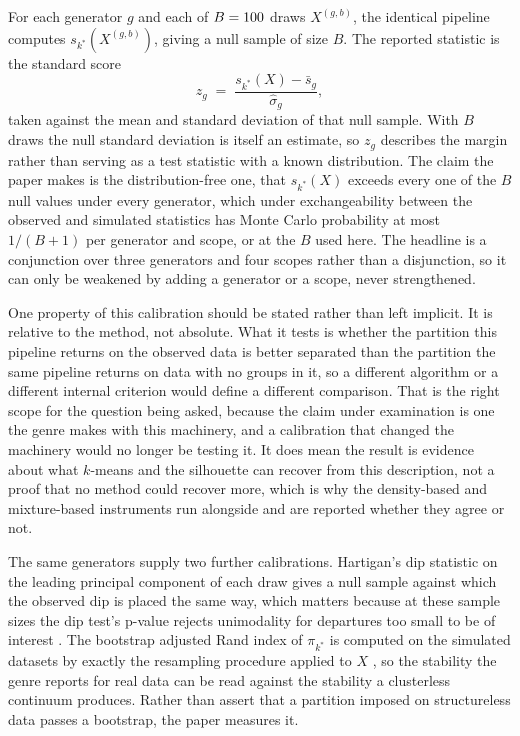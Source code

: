 For each generator $g$ and each of $B = 100{}$ draws $X^{(g,b)}$, the identical
pipeline computes $s_{k^\ast}(X^{(g,b)})$, giving a null sample of size $B$. The reported
statistic is the standard score
\[
  z_g \;=\; \frac{s_{k^\ast}(X) - \bar s_g}{\hat\sigma_g},
\]
taken against the mean and standard deviation of that null sample. With $B$ draws the null
standard deviation is itself an estimate, so $z_g$ describes the margin rather than serving as a
test statistic with a known distribution. The claim the paper makes is the distribution-free
one, that $s_{k^\ast}(X)$ exceeds every one of the $B$ null values under every generator, which
under exchangeability between the observed and simulated statistics has Monte Carlo probability
at most $1/(B+1)$ per generator and scope, or \StrMCBound{} at the $B$ used here. The headline is a conjunction over three generators
and four scopes rather than a disjunction, so it can only be weakened by adding a generator or a
scope, never strengthened.

One property of this calibration should be stated rather than left implicit. It is relative to
the method, not absolute. What it tests is whether the partition this pipeline returns on the
observed data is better separated than the partition the same pipeline returns on data with no
groups in it, so a different algorithm or a different internal criterion would define a
different comparison. That is the right scope for the question being asked, because the claim
under examination is one the genre makes with this machinery, and a calibration that changed
the machinery would no longer be testing it. It does mean the result is evidence about what
$k$-means and the silhouette can recover from this description, not a proof that no method
could recover more, which is why the density-based and mixture-based instruments run alongside
and are reported whether they agree or not.

The same generators supply two further calibrations. Hartigan's dip statistic on the leading
principal component of each draw gives a null sample against which the observed dip is placed
the same way, which matters because at these sample sizes the dip test's p-value rejects
unimodality for departures too small to be of interest \citep{hartigan1985dip}. The bootstrap
adjusted Rand index of $\pi_{k^\ast}$ is computed on the simulated datasets by exactly the
resampling procedure applied to $X$ \citep{hubert1985comparing}, so the stability the genre
reports for real data can be read against the stability a clusterless continuum produces. Rather
than assert that a partition imposed on structureless data passes a bootstrap, the paper
measures it.

